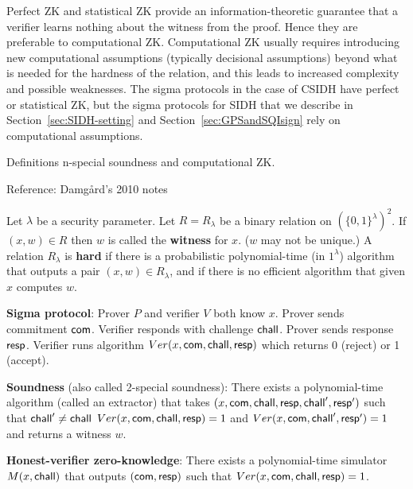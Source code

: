 \begin{remark}
Perfect ZK and statistical ZK provide an information-theoretic guarantee that a verifier learns nothing about the witness from the proof. Hence they are preferable to computational ZK.
Computational ZK usually requires introducing new computational assumptions (typically decisional assumptions) beyond what is needed for the hardness of the relation, and this leads to increased complexity and possible weaknesses.
The sigma protocols in the case of CSIDH have perfect or statistical ZK, but the sigma protocols for SIDH that we describe in Section~\ref{sec:SIDH-setting} and Section~\ref{sec:GPSandSQIsign} rely on computational assumptions.  
\end{remark}




\iffalse

Definitions n-special soundness and computational ZK.


Reference: Damg{\aa}rd's 2010 notes

Let $\lambda$ be a security parameter.
Let $R = R_\lambda$ be a binary relation on $(\{ 0,1 \}^\lambda )^2$. If $(x,w) \in R$ then $w$ is called the \textbf{witness} for $x$. ($w$ may not be unique.)
A relation $R_\lambda$ is \textbf{hard} if there is a probabilistic polynomial-time (in $1^\lambda$) algorithm that outputs a pair $(x, w) \in R_\lambda$, and if there is no efficient algorithm that given $x$ computes $w$.


\textbf{Sigma protocol}: Prover $P$ and verifier $V$ both know $x$. Prover sends commitment $\mathsf{com}$. Verifier responds with challenge $\mathsf{chall}$. Prover sends response $\mathsf{resp}$. Verifier runs algorithm
$Ver( x, \mathsf{com}, \mathsf{chall}, \mathsf{resp} )$ which returns 0 (reject) or 1 (accept).


\textbf{Soundness} (also called 2-special soundness):
There exists a polynomial-time algorithm (called an extractor) that takes $( x, \mathsf{com}, \mathsf{chall}, \mathsf{resp} , \mathsf{chall}', \mathsf{resp}')$ such that $\mathsf{chall}' \ne \mathsf{chall}$
$Ver( x, \mathsf{com}, \mathsf{chall}, \mathsf{resp} ) = 1 $ and $Ver( x, \mathsf{com}, \mathsf{chall}', \mathsf{resp}' ) = 1$ and returns a witness $w$.

\textbf{Honest-verifier zero-knowledge}:
There exists a polynomial-time simulator $M(x,\mathsf{chall})$ that outputs $(\mathsf{com}, \mathsf{resp})$ such that $Ver( x, \mathsf{com}, \mathsf{chall}, \mathsf{resp} ) = 1 $.

